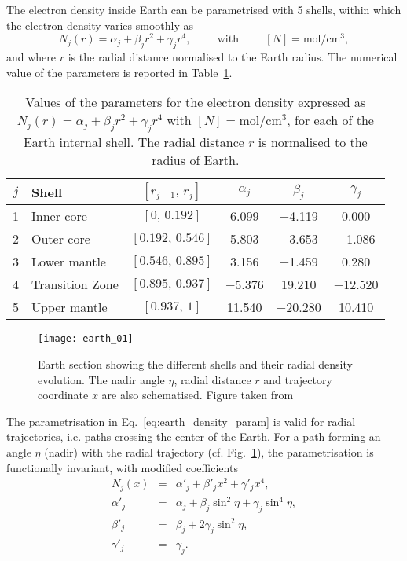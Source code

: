 \documentclass[11pt,a4paper]{article}
\newcommand{\cm}[0]{\text{cm}}
\begin{document}
The electron density inside Earth can be parametrised with 5 shells, within which the electron density varies smoothly as~\cite{Lisi:1997yc}
\begin{equation}\label{eq:earth_density_param}
	N_j(r) = \alpha_j + \beta_j r^2 + \gamma_j r^4, \hspace{1cm} \text{with} \hspace{1cm} \left[N\right] = \text{mol}/\cm^3,
\end{equation}
and where $r$ is the radial distance normalised to the Earth radius. The numerical value of the parameters is reported in Table~\ref{tab:shell_parameters}.

\begin{table}[ht]
\begin{tabular}{clcccc}
\hline
\hline
$j$& Shell          & $[r_{j-1},\,r_j]$  &$\alpha_j$ &$\beta_j$ &$\gamma_j$\\
\hline
1 & Inner core      &     $[0,\,0.192]$    &   6.099 & $-$4.119 &    0.000 \\
2 & Outer core      &   $[0.192,\,0.546]$  &   5.803 & $-$3.653 & $-$1.086 \\
3 & Lower mantle    &   $[0.546,\,0.895]$  &   3.156 & $-$1.459 &    0.280 \\
4 & Transition Zone &   $[0.895,\,0.937]$  &$-$5.376 &   19.210 &$-$12.520 \\
5 & Upper mantle    &     $[0.937,\,1]$    &  11.540 &$-$20.280 &   10.410 \\
\hline 
\hline
\end{tabular}
\caption{\label{tab:shell_parameters}Values of the parameters for the electron density expressed as $N_j(r) = \alpha_j + \beta_j r^2 + \gamma_j r^4$ with $[N] = \text{mol}/\cm^3$, for each of the Earth internal shell. The radial distance $r$ is normalised to the radius of Earth.}
\end{table}

\begin{figure}[ht]
	\texttt{[image: earth\_01]}
	\caption{Earth section showing the different shells and their radial density evolution. The nadir angle $\eta$, radial distance $r$ and trajectory coordinate $x$ are also schematised. Figure taken from~\cite{Lisi:1997yc}}
	\label{fig:earth_density}	
\end{figure}

The parametrisation in Eq.~\ref{eq:earth_density_param} is valid for radial trajectories, i.e. paths crossing the center of the Earth. For a path forming an angle $\eta$ (nadir) with the radial trajectory (cf. Fig.~\ref{fig:earth_density}), the parametrisation is functionally invariant, with modified coefficients
\begin{eqnarray}
	N_j(x) &=& \alpha'_j + \beta'_j x^2 + \gamma'_j x^4, \label{eq:earth_density_nadir} \\
	\alpha'_j &=& \alpha_j + \beta_j \sin^2 \eta + \gamma_j \sin^4\eta, \\
	\beta'_j &=& \beta_j + 2 \gamma_j \sin^2\eta, \\
	\gamma'_j &=& \gamma_j.
\end{eqnarray}
\end{document}
